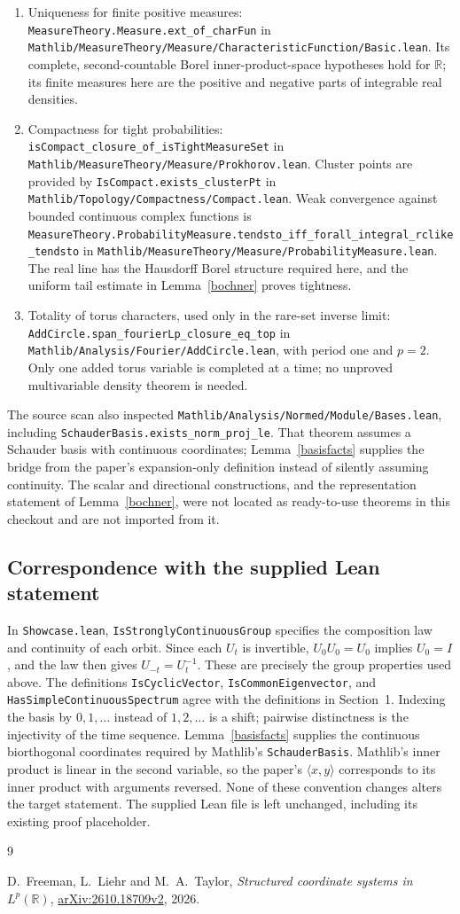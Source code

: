 \documentclass[reqno,a4paper,12pt]{amsart}
\newcommand{\R}{\mathbb R}
\newcommand{\ip}[2]{\langle #1,#2\rangle}
\newcommand{\ml}[1]{\nolinkurl{#1}}
\begin{document}
\begin{enumerate}
\item Uniqueness for finite positive measures:
\ml{MeasureTheory.Measure.ext_of_charFun} in
\ml{Mathlib/MeasureTheory/Measure/CharacteristicFunction/Basic.lean}.
Its complete, second-countable Borel inner-product-space hypotheses
hold for $\R$; its finite measures here are the positive and negative
parts of integrable real densities.
\item Compactness for tight probabilities:
\ml{isCompact_closure_of_isTightMeasureSet} in
\ml{Mathlib/MeasureTheory/Measure/Prokhorov.lean}.
Cluster points are provided by \ml{IsCompact.exists_clusterPt} in
\ml{Mathlib/Topology/Compactness/Compact.lean}.
Weak convergence against bounded continuous complex functions is
\ml{MeasureTheory.ProbabilityMeasure.tendsto_iff_forall_integral_rclike_tendsto}
in \ml{Mathlib/MeasureTheory/Measure/ProbabilityMeasure.lean}.
The real line has the Hausdorff Borel structure required here, and the
uniform tail estimate in Lemma~\ref{bochner} proves tightness.
\item Totality of torus characters, used only in the rare-set inverse limit:
\ml{AddCircle.span_fourierLp_closure_eq_top} in
\ml{Mathlib/Analysis/Fourier/AddCircle.lean}, with period one and $p=2$.
Only one added torus variable is completed at a time; no unproved
multivariable density theorem is needed.
\end{enumerate}

The source scan also inspected
\ml{Mathlib/Analysis/Normed/Module/Bases.lean}, including
\ml{SchauderBasis.exists_norm_proj_le}. That theorem assumes a
Schauder basis with continuous coordinates; Lemma~\ref{basisfacts}
supplies the bridge from the paper's expansion-only definition instead
of silently assuming continuity. The scalar and directional constructions,
and the representation statement of Lemma~\ref{bochner}, were not located
as ready-to-use theorems in this checkout and are not imported from it.
\endgroup

\subsection{Correspondence with the supplied Lean statement}
In \ml{Showcase.lean}, \ml{IsStronglyContinuousGroup} specifies the
composition law and continuity of each orbit. Since each $U_t$ is
invertible, $U_0U_0=U_0$ implies $U_0=I$, and the law then gives
$U_{-t}=U_t^{-1}$. These are precisely the group properties used above.
The definitions \ml{IsCyclicVector}, \ml{IsCommonEigenvector}, and
\ml{HasSimpleContinuousSpectrum} agree with the definitions in Section~1.
Indexing the basis by $0,1,\ldots$ instead of $1,2,\ldots$ is a shift;
pairwise distinctness is the injectivity of the time sequence.
Lemma~\ref{basisfacts} supplies the continuous biorthogonal coordinates
required by Mathlib's \ml{SchauderBasis}. Mathlib's inner product is
linear in the second variable, so the paper's $\ip{x}{y}$ corresponds
to its inner product with arguments reversed. None of these convention
changes alters the target statement. The supplied Lean file is left
unchanged, including its existing proof placeholder.

\begin{thebibliography}{9}
\raggedright
{} D.~Freeman, L.~Liehr and M.~A.~Taylor,
\emph{Structured coordinate systems in $L^p(\R)$},
\href{https://arxiv.org/html/2610.18709v2}{arXiv:2610.18709v2}, 2026.
\end{thebibliography}
\end{document}
